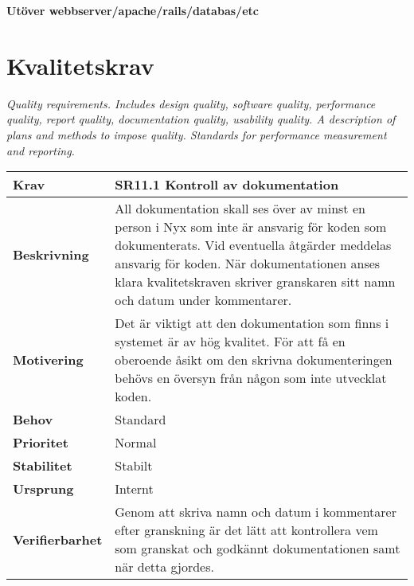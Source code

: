 \documentclass[a4paper, twoside, 11pt, titlepage]{article}
\begin{document}
\textbf{Utöver webbserver/apache/rails/databas/etc}

\clearpage
\section{Kvalitetskrav}


\emph{Quality requirements. Includes design quality, software quality, performance quality, report quality, documentation quality, usability quality. A description of plans and methods to impose quality. Standards for performance measurement and reporting.}

\begin{tabular} { p{2.6cm} p{12.5cm} }
	\hline
	\sffamily\textbf{Krav} & \sffamily\textbf{SR11.1 Kontroll av dokumentation } \\
	\hline
	\sffamily\textbf{Beskrivning} &  All dokumentation skall ses över av minst en person i Nyx som inte är ansvarig för koden som dokumenterats. Vid eventuella åtgärder meddelas ansvarig för koden. När dokumentationen anses klara kvalitetskraven skriver granskaren sitt namn och datum under kommentarer.  \\
	\hline
	\sffamily\textbf{Motivering} &  Det är viktigt att den dokumentation som finns i systemet är av hög kvalitet. För att få en oberoende åsikt om den skrivna dokumenteringen behövs en översyn från någon som inte utvecklat koden.  \\
	\hline
	\sffamily\textbf{Behov} & Standard  \\
	\hline
	\sffamily\textbf{Prioritet} & Normal  \\
	\hline
	\sffamily\textbf{Stabilitet} & Stabilt  \\
	\hline
	\sffamily\textbf{Ursprung} & Internt  \\
	\hline
	\sffamily\textbf{Verifierbarhet} &  Genom att skriva namn och datum i kommentarer efter granskning är det lätt att kontrollera vem som granskat och godkännt dokumentationen samt när detta gjordes.  \\
	\hline
\end{tabular}
\vspace{6mm}
\end{document}
